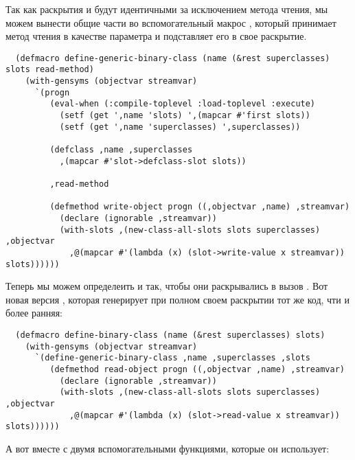 Так как раскрытия  и  будут
идентичными за исключением метода чтения, мы можем вынести общие части во вспомогательный
макрос , который принимает метод чтения в качестве
параметра и подставляет его в свое раскрытие.

\begin{lstlisting}
  (defmacro define-generic-binary-class (name (&rest superclasses) slots read-method)
    (with-gensyms (objectvar streamvar)
      `(progn
         (eval-when (:compile-toplevel :load-toplevel :execute)
           (setf (get ',name 'slots) ',(mapcar #'first slots))
           (setf (get ',name 'superclasses) ',superclasses))

         (defclass ,name ,superclasses
           ,(mapcar #'slot->defclass-slot slots))

         ,read-method

         (defmethod write-object progn ((,objectvar ,name) ,streamvar)
           (declare (ignorable ,streamvar))
           (with-slots ,(new-class-all-slots slots superclasses) ,objectvar
             ,@(mapcar #'(lambda (x) (slot->write-value x streamvar)) slots))))))
\end{lstlisting}

Теперь мы можем определеить  и  так, чтобы они раскрывались в вызов . Вот новая версия , которая генерирует при полном своем раскрытии тот же код, чти и более ранняя:

\begin{lstlisting}
  (defmacro define-binary-class (name (&rest superclasses) slots)
    (with-gensyms (objectvar streamvar)
      `(define-generic-binary-class ,name ,superclasses ,slots
         (defmethod read-object progn ((,objectvar ,name) ,streamvar)
           (declare (ignorable ,streamvar))
           (with-slots ,(new-class-all-slots slots superclasses) ,objectvar
             ,@(mapcar #'(lambda (x) (slot->read-value x streamvar)) slots))))))
\end{lstlisting}

А вот  вместе с двумя вспомогательными функциями, которые
он использует:

